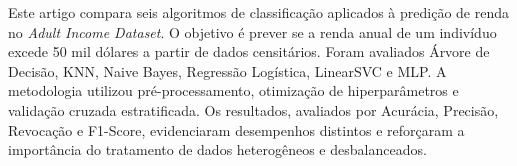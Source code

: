 
\begin{resumo}
Este artigo compara seis algoritmos de classificação aplicados à predição de renda no \textit{Adult Income Dataset}. O objetivo é prever se a renda anual de um indivíduo excede 50 mil dólares a partir de dados censitários. Foram avaliados Árvore de Decisão, KNN, Naive Bayes, Regressão Logística, LinearSVC e MLP. A metodologia utilizou pré-processamento, otimização de hiperparâmetros e validação cruzada estratificada. Os resultados, avaliados por Acurácia, Precisão, Revocação e F1-Score, evidenciaram desempenhos distintos e reforçaram a importância do tratamento de dados heterogêneos e desbalanceados.
\end{resumo}

\begin{abstract}
This paper compares six classification algorithms applied to income prediction using the \textit{Adult Income Dataset}. The goal is to predict whether an individual's annual income exceeds \$50,000 based on census data. Decision Tree, KNN, Naive Bayes, Logistic Regression, LinearSVC, and MLP were evaluated. The methodology used preprocessing, hyperparameter optimization, and stratified cross-validation. The results, assessed through Accuracy, Precision, Recall, and F1-Score, showed different performance profiles and reinforced the importance of handling heterogeneous and imbalanced data.
\end{abstract}


\clearpage
